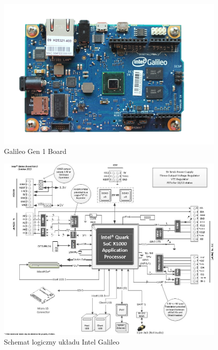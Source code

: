 \documentclass{xmgr}
\begin{document}
\begin{figure}[!h]
    \centering
    \includegraphics[height=0.4\textwidth]{images/galileo.png}
    \caption{Galileo Gen 1 Board \label{Galileo Gen 1 Board}}
\end{figure}

\begin{figure}[!h]
    \centering
    \includegraphics[height=0.8\textwidth]{images/IntelGalileoLogicSchematics.jpg}
    \caption{Schemat logiczny układu Intel Galileo\label{IntelGalileoLogicSchematics}}
\end{figure}
\end{document}
